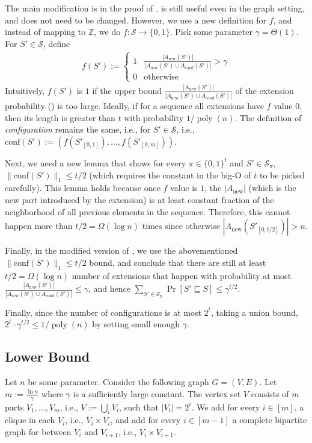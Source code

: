 \documentclass[11pt,letterpaper]{article}
\theoremstyle{plain}
\theoremstyle{definition}
\theoremstyle{remark}
\DeclareMathOperator{\poly}{poly}
\newcommand{\Acond}{\ensuremath{A_{\mathrm{cond}}}\xspace}
\newcommand{\Anew}{\ensuremath{A_{\mathrm{new}}}\xspace}
\newcommand{\conf}{\ensuremath{\mathrm{conf}}\xspace}
\begin{document}
The main modification is in the proof of .
 is still useful even in the graph setting,
and does not need to be changed.
However, we use a new definition for $f$, and instead of mapping to $\mathbb{Z}$,
we do $f : \mathcal{S} \to \{0, 1\}$.
Pick some parameter $\gamma = \Theta(1)$.
For $S' \in \mathcal{S}$, define 
\begin{align*}
    f(S') := \begin{cases}
        1 & \frac{|\Anew(S')|}{|\Anew(S') \cup \Acond(S')|} > \gamma \\
        0 & \text{otherwise}
    \end{cases}
\end{align*}
Intuitively, $f(S')$ is $1$ if the upper bound $\frac{|\Anew(S')|}{|\Anew(S') \cup \Acond(S')|}$ of the extension probability () is too large.
Ideally, if for a sequence all extensions have $f$ value $0$, then its length is greater than $t$ with probability $1 / \poly(n)$.
The definition of \emph{configuration} remains the same, i.e., for $S' \in \mathcal{S}$,
i.e., $\conf(S'):= (f(S'_{[0,1]}), \ldots, f(S'_{[0, m]}))$.

Next, we need a new lemma that shows for every $\pi \in \{0, 1\}^t$ and $S' \in \mathcal{S}_\pi$,
$\|\conf(S') \|_1 \leq t / 2$ (which requires the constant in the big-O of $t$ to be picked carefully).
This lemma holds because once $f$ value is $1$, the $|\Anew|$ (which is the new part introduced by the extension) is at least constant fraction of the neighborhood of all previous elements in the sequence.
Therefore, this cannot happen more than $t / 2 = \Omega(\log n)$ times since otherwise $|\Anew(S'_{[0, t / 2]})| > n$.

Finally, in the modified version of ,
we use the abovementioned $\|\conf(S')\|_1 \leq t / 2$ bound,
and conclude that there are still at least $t / 2 = \Omega(\log n)$ number of extensions
that happen with probability at most  $\frac{|\Anew(S')|}{|\Anew(S') \cup \Acond(S')|} \leq \gamma$,
and hence $\sum_{S' \in \mathcal{S}_\pi}\Pr[S' \sqsubseteq S] \leq \gamma^{t / 2}$.

Finally, since the number of configurations is at most $2^t$,
taking a union bound, $2^t \cdot \gamma^{t / 2} \leq 1 / \poly(n)$ by setting small enough $\gamma$.

\subsection{Lower Bound}
\label{sec:luby_graph_lb}
Let $n$ be some parameter.
Consider the following graph $G = (V, E)$.
Let $m := \frac{\ln n}{\gamma}$ where $\gamma$ is a sufficiently large constant.
The vertex set $V$ consists of $m$ parts $V_1, \ldots, V_m$, i.e., $V := \bigcup_i V_i$,
such that $|V_i| = 2^i$.
We add for every $i \in [m]$, a clique in each $V_i$, i.e., $V_i \times V_i$,
and add for every $i \in [m - 1]$
a complete bipartite graph for between $V_i$ and $V_{i + 1}$, i.e., $V_i \times V_{i + 1}$.
\end{document}
